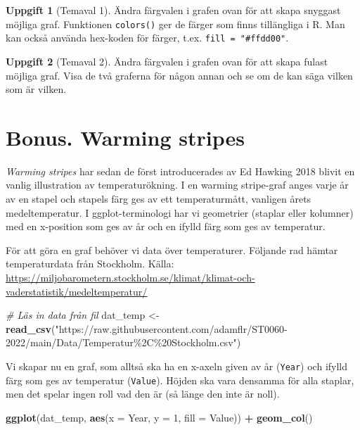 \documentclass[
]{book}
\newenvironment{Shaded}{\begin{snugshade}}{\end{snugshade}}
\newcommand{\AttributeTok}[1]{\textcolor[rgb]{0.13,0.29,0.53}{#1}}
\newcommand{\CommentTok}[1]{\textcolor[rgb]{0.56,0.35,0.01}{\textit{#1}}}
\newcommand{\DecValTok}[1]{\textcolor[rgb]{0.00,0.00,0.81}{#1}}
\newcommand{\FunctionTok}[1]{\textcolor[rgb]{0.13,0.29,0.53}{\textbf{#1}}}
\newcommand{\NormalTok}[1]{#1}
\newcommand{\OtherTok}[1]{\textcolor[rgb]{0.56,0.35,0.01}{#1}}
\newcommand{\SpecialCharTok}[1]{\textcolor[rgb]{0.81,0.36,0.00}{\textbf{#1}}}
\newcommand{\StringTok}[1]{\textcolor[rgb]{0.31,0.60,0.02}{#1}}
\theoremstyle{definition}
\theoremstyle{definition}
\theoremstyle{definition}
\newtheorem{exercise}{Uppgift}[chapter]
\theoremstyle{definition}
\theoremstyle{remark}
\begin{document}
\begin{exercise}[Temaval 1]
Ändra färgvalen i grafen ovan för att skapa snyggast möjliga graf. Funktionen \texttt{colors()} ger de färger som finns tillängliga i R. Man kan också använda hex-koden för färger, t.ex. \texttt{fill\ =\ "\#ffdd00"}.
\end{exercise}

\begin{exercise}[Temaval 2]
Ändra färgvalen i grafen ovan för att skapa fulast möjliga graf. Visa de två graferna för någon annan och se om de kan säga vilken som är vilken.
\end{exercise}

\hypertarget{bonus.-warming-stripes}{%
\section{Bonus. Warming stripes}\label{bonus.-warming-stripes}}

\emph{Warming stripes} har sedan de först introducerades av Ed Hawking 2018 blivit en vanlig illustration av temperaturökning. I en warming stripe-graf anges varje år av en stapel och stapels färg ges av ett temperaturmått, vanligen årets medeltemperatur. I ggplot-terminologi har vi geometrier (staplar eller kolumner) med en x-position som ges av år och en ifylld färg som ges av temperatur.

För att göra en graf behöver vi data över temperaturer. Följande rad hämtar temperaturdata från Stockholm. Källa: \url{https://miljobarometern.stockholm.se/klimat/klimat-och-vaderstatistik/medeltemperatur/}

\begin{Shaded}
\begin{Highlighting}[]
\CommentTok{\# Läs in data från fil}
\NormalTok{dat\_temp }\OtherTok{\textless{}{-}} \FunctionTok{read\_csv}\NormalTok{(}\StringTok{"https://raw.githubusercontent.com/adamflr/ST0060{-}2022/main/Data/Temperatur\%2C\%20Stockholm.csv"}\NormalTok{)}
\end{Highlighting}
\end{Shaded}

Vi skapar nu en graf, som alltså ska ha en x-axeln given av år (\texttt{Year}) och ifylld färg som ges av temperatur (\texttt{Value}). Höjden ska vara densamma för alla staplar, men det spelar ingen roll vad den är (så länge den inte är noll).

\begin{Shaded}
\begin{Highlighting}[]
\FunctionTok{ggplot}\NormalTok{(dat\_temp, }\FunctionTok{aes}\NormalTok{(}\AttributeTok{x =}\NormalTok{ Year, }\AttributeTok{y =} \DecValTok{1}\NormalTok{, }\AttributeTok{fill =}\NormalTok{ Value)) }\SpecialCharTok{+}
  \FunctionTok{geom\_col}\NormalTok{() }
\end{Highlighting}
\end{Shaded}
\end{document}
